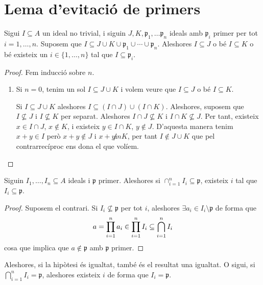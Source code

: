 \documentclass[../../../main.tex]{subfiles}
\begin{document}
\section{Lema d'evitació de primers}


\begin{lema}
\label{lema:evitacioPrimersUnio} Sigui $I\subseteq A$ un ideal no trivial, i siguin $J,K,\mathfrak{p}_1,\ldots\mathfrak{p}_n$ ideals amb $\mathfrak{p}_i$ primer per tot $i=1,\ldots,n$. Suposem que $I\subseteq J\cup K\cup\mathfrak{p}_1\cup\cdots\cup \mathfrak{p}_n$. Aleshores $I\subseteq J$ o bé $I\subseteq K$ o bé existeix un $i\in\{1,\ldots,n\}$ tal que $I\subseteq\mathfrak{p}_i$.
\end{lema}
\begin{proof}
Fem inducció sobre $n$.
\begin{enumerate}
    \item Si $n = 0$, tenim un sol $I\subseteq J\cup K$ i volem veure que $I\subseteq J$ o bé $I\subseteq K$.
    
    Si $I\subseteq J\cup K$ aleshores $I\subseteq (I\cap J)\cup(I\cap K)$. Aleshores, suposem que $I\not\subseteq J$ i $I\not\subseteq K$ per separat. Aleshores $I\cap J\not\subseteq K$ i $I\cap K\not\subseteq J$. Per tant, existeix $x\in I\cap J$, $x\not\in K$, i existeix $y\in I\cap K$, $y\not\in J$. D'aquesta manera tenim $x+y \in I$ però $x+y\not\in J$ i $x+y\not in K$, per tant $I\not\in J\cup K$ que pel contrarrecíproc ens dona el que volíem.
\end{enumerate}
\end{proof}


\begin{lema}
\label{lema:evitacioPrimersInterseccio}Siguin $I_1,\ldots,I_n\subseteq A$ ideals i $\mathfrak{p}$ primer. Aleshores si $\cap_{i=1}^n I_i\subseteq \mathfrak{p}$, existeix $i$ tal que $I_i\subseteq \mathfrak{p}$.
\end{lema}
\begin{proof}
Suposem el contrari. Si $I_i\not\subseteq\mathfrak{p}$ per tot $i$, aleshores $\exists a_i\in I_i\setminus \mathfrak{p}$ de forma que 
\begin{equation}
    \notag
    a = \prod_{i=1}^n a_i\in\prod_{i=1}^n I_i\subseteq \bigcap_{i=1}^n I_i
\end{equation}
cosa que implica que $a\not\in\mathfrak{p}$ amb $\mathfrak{p}$ primer.
\end{proof}

Aleshores, si la hipòtesi és igualtat, també és el resultat una igualtat. O sigui, si $\bigcap_{i=1}^n I_i = \mathfrak{p}$, aleshores existeix $i$ de forma que $I_i = \mathfrak{p}$.
\end{document}
